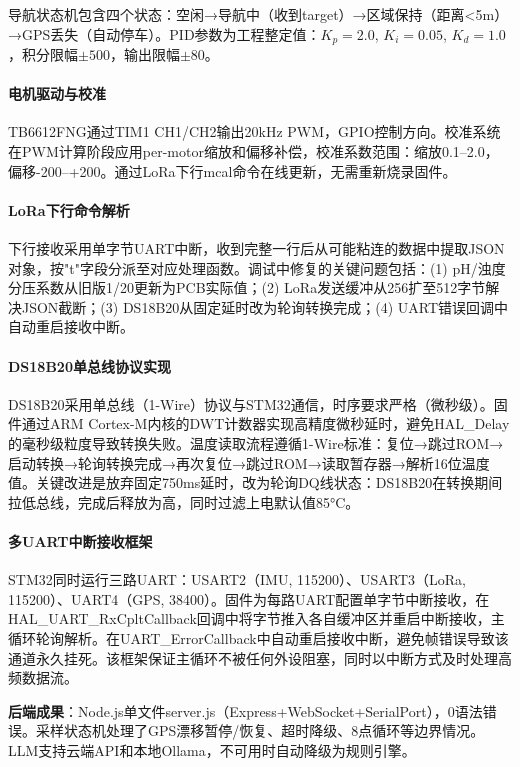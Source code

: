 \documentclass[12pt,a4paper]{ctexart}
\begin{document}
导航状态机包含四个状态：空闲→导航中（收到target）→区域保持（距离<5m）→GPS丢失（自动停车）。PID参数为工程整定值：$K_p=2.0$, $K_i=0.05$, $K_d=1.0$，积分限幅$\pm500$，输出限幅$\pm80$。

\paragraph{电机驱动与校准}

TB6612FNG通过TIM1 CH1/CH2输出20kHz PWM，GPIO控制方向。校准系统在PWM计算阶段应用per-motor缩放和偏移补偿，校准系数范围：缩放0.1--2.0，偏移-200--+200。通过LoRa下行mcal命令在线更新，无需重新烧录固件。

\paragraph{LoRa下行命令解析}

下行接收采用单字节UART中断，收到完整一行后从可能粘连的数据中提取JSON对象，按"t"字段分派至对应处理函数。调试中修复的关键问题包括：(1) pH/浊度分压系数从旧版1/20更新为PCB实际值；(2) LoRa发送缓冲从256扩至512字节解决JSON截断；(3) DS18B20从固定延时改为轮询转换完成；(4) UART错误回调中自动重启接收中断。

\paragraph{DS18B20单总线协议实现}

DS18B20采用单总线（1-Wire）协议与STM32通信，时序要求严格（微秒级）。固件通过ARM Cortex-M内核的DWT计数器实现高精度微秒延时，避免HAL\_Delay的毫秒级粒度导致转换失败。温度读取流程遵循1-Wire标准：复位→跳过ROM→启动转换→轮询转换完成→再次复位→跳过ROM→读取暂存器→解析16位温度值。关键改进是放弃固定750ms延时，改为轮询DQ线状态：DS18B20在转换期间拉低总线，完成后释放为高，同时过滤上电默认值85°C。

\paragraph{多UART中断接收框架}

STM32同时运行三路UART：USART2（IMU, 115200）、USART3（LoRa, 115200）、UART4（GPS, 38400）。固件为每路UART配置单字节中断接收，在HAL\_UART\_RxCpltCallback回调中将字节推入各自缓冲区并重启中断接收，主循环轮询解析。在UART\_ErrorCallback中自动重启接收中断，避免帧错误导致该通道永久挂死。该框架保证主循环不被任何外设阻塞，同时以中断方式及时处理高频数据流。

\textbf{后端成果}：Node.js单文件server.js（Express+WebSocket+SerialPort），0语法错误。采样状态机处理了GPS漂移暂停/恢复、超时降级、8点循环等边界情况。LLM支持云端API和本地Ollama，不可用时自动降级为规则引擎。
\end{document}

